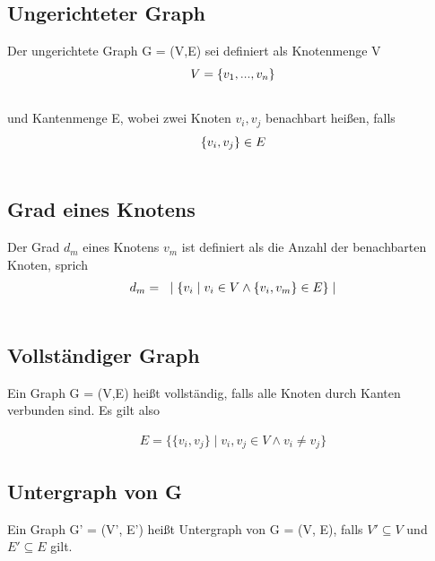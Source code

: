 \documentclass[12pt, a4paper]{article}
\begin{document}
\subsection{Ungerichteter Graph}
\label{theorem:ungerichteter-graph}
Der ungerichtete Graph G = (V,E) sei definiert als Knotenmenge V
\begin{gather}
\begin{split}V = \{ v_1, ..., v_n \}\end{split}\notag\\\begin{split}\end{split}\notag
\end{gather}
und Kantenmenge E, wobei zwei Knoten $v_i, v_j$ benachbart heißen, falls
\begin{gather}
\begin{split}\{v_i, v_j\} \in E\end{split}\notag\\\begin{split}\end{split}\notag
\end{gather}

\subsection{Grad eines Knotens}
\label{theorem:grad-eines-knotens}
Der Grad $d_m$ eines Knotens $v_m$ ist definiert als die Anzahl der benachbarten Knoten, sprich
\begin{gather}
\begin{split}d_m = \text{  } \mid \{ v_i \mid v_i \in V \wedge \{ v_i, v_m \} \in E \} \mid\end{split}\notag\\\begin{split}\end{split}\notag
\end{gather}

\subsection{Vollständiger Graph}
Ein Graph G = (V,E) heißt vollständig, falls alle Knoten durch Kanten verbunden sind. Es gilt also 

\begin{align*}
	E  = \{ \{ v_i , v_j \} \mid v_i, v_j \in V  \wedge v_i \neq v_j \}
\end{align*}

\subsection{Untergraph von G}
Ein Graph G' = (V', E') heißt Untergraph von G = (V, E), falls $V' \subseteq V$ und $E' \subseteq E$ gilt. 
\end{document}
